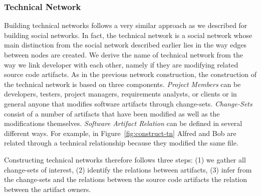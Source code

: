 
\subsubsection{Technical Network}

Building technical networks follows a very similar approach as we described for building social networks.
In fact, the technical network is a social network whose main distinction from the social network described earlier lies in the way edges between nodes are created.
We derive the name of technical network from the way we link developer with each other, namely if they are modifying related source code artifacts.
As in the previous network construction, the construction of the technical network is based on three components.
%
\emph{Project Members}  can be developers, testers, project managers, requirements analysts,
or clients or in general anyone that modifies software artifacts through change-sets. 
%
\emph{Change-Sets} consist of a number of artifacts that have been modified as well as the modifications themselves.
%
\emph{Software Artifact Relation}  can be defined in several different ways.
For example, in Figure~\ref{fig:construct-tn} Alfred and Bob are related through a technical relationship because they modified the same file.

Constructing technical networks therefore follows three steps: (1) we gather all change-sets of interest, (2) identify the relations between artifacts, (3) infer from the change-sets and the relations between the source code artifacts the relation between the artifact owners.

